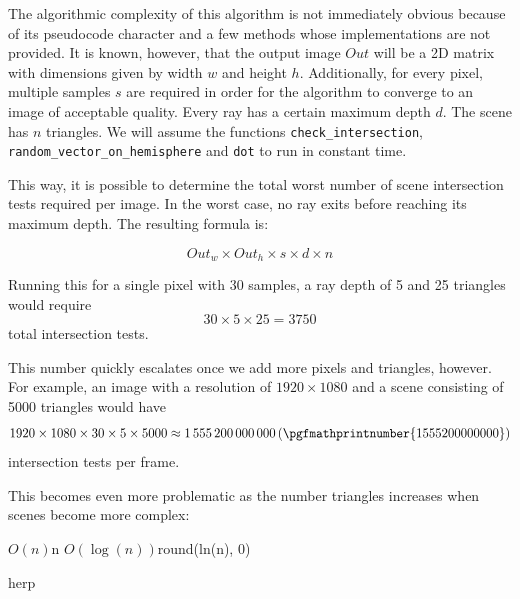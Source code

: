 \documentclass[
  twoside,
  11pt, a4paper,
  footinclude=true,
  headinclude=true,
  cleardoublepage=empty
]{scrreprt}
\begin{document}
\vspace{0.5cm}

The algorithmic complexity of this algorithm is not immediately obvious because of its pseudocode
character and a few methods whose implementations are not provided. It is known, however, that
the output image \(Out\) will be a 2D matrix with dimensions given by width \(w\) and height \(h\).
Additionally, for every pixel, multiple samples \(s\) are required in order for the algorithm to
converge to an image of acceptable quality. Every ray has a certain maximum depth \(d\).
The scene has \(n\) triangles. We will assume the functions \texttt{check\_intersection},
\texttt{random\_vector\_on\_hemisphere} and \texttt{dot} to run in constant time.

This way, it is possible to determine the total worst number of scene intersection tests required per image.
In the worst case, no ray exits before reaching its maximum depth. The resulting formula is:

\[ Out_w \times Out_h \times s \times d \times n \]

Running this for a single pixel with 30 samples, a ray depth of 5 and 25 triangles would require
\[30 \times 5 \times 25 = \num{3750}\]
total intersection tests.

This number quickly escalates once we add more pixels and triangles, however.
For example, an image with a resolution of \(1920 \times 1080\) and a scene consisting of 5000
triangles would have \[1920 \times 1080 \times 30 \times 5 \times 5000 \approx \num{1555200000000}
\, (\pgfmathprintnumber{1555200000000})\] intersection tests per frame.

This becomes even more problematic as the number triangles increases when scenes become more
complex:

\begin{table}[H]
    \centering
                  {\(O(n)\)}{n}
                  {\(O(\log(n))\)}{round(ln(n), 0)}
    \caption{herp}
    \label{tbl:triangle-intersections-count}
\end{table}

\end{document}
